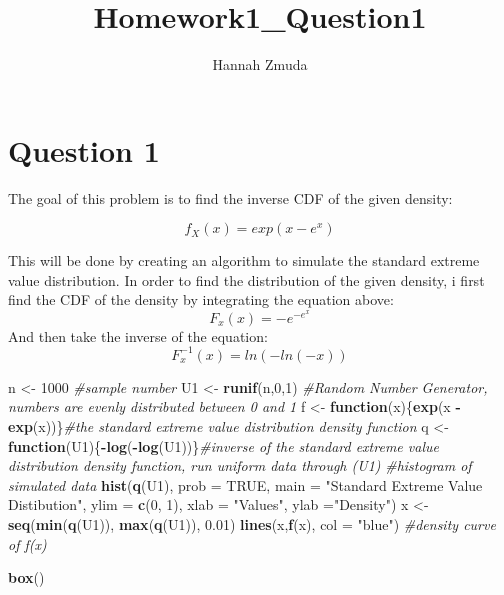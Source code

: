 \documentclass[
]{article}
\title{Homework1\_Question1}
\author{Hannah Zmuda}
\date{}
\newenvironment{Shaded}{\begin{snugshade}}{\end{snugshade}}
\newcommand{\CommentTok}[1]{\textcolor[rgb]{0.56,0.35,0.01}{\textit{#1}}}
\newcommand{\ControlFlowTok}[1]{\textcolor[rgb]{0.13,0.29,0.53}{\textbf{#1}}}
\newcommand{\DataTypeTok}[1]{\textcolor[rgb]{0.13,0.29,0.53}{#1}}
\newcommand{\DecValTok}[1]{\textcolor[rgb]{0.00,0.00,0.81}{#1}}
\newcommand{\FloatTok}[1]{\textcolor[rgb]{0.00,0.00,0.81}{#1}}
\newcommand{\KeywordTok}[1]{\textcolor[rgb]{0.13,0.29,0.53}{\textbf{#1}}}
\newcommand{\NormalTok}[1]{#1}
\newcommand{\OperatorTok}[1]{\textcolor[rgb]{0.81,0.36,0.00}{\textbf{#1}}}
\newcommand{\OtherTok}[1]{\textcolor[rgb]{0.56,0.35,0.01}{#1}}
\newcommand{\StringTok}[1]{\textcolor[rgb]{0.31,0.60,0.02}{#1}}
\begin{document}
\maketitle

\hypertarget{question-1}{%
\section{Question 1}\label{question-1}}

The goal of this problem is to find the inverse CDF of the given
density:

\[ f_X(x) = exp(x - e^x)\]

This will be done by creating an algorithm to simulate the standard
extreme value distribution. In order to find the distribution of the
given density, i first find the CDF of the density by integrating the
equation above: \[F_x(x) = -e^{-e^{x}}\] And then take the inverse of
the equation: \[F_x^{-1}(x) = ln(-ln(-x))\]

\begin{Shaded}
\begin{Highlighting}[]
\NormalTok{n <-}\StringTok{ }\DecValTok{1000} \CommentTok{#sample number}
\NormalTok{U1 <-}\StringTok{ }\KeywordTok{runif}\NormalTok{(n,}\DecValTok{0}\NormalTok{,}\DecValTok{1}\NormalTok{) }\CommentTok{#Random Number Generator, numbers are evenly distributed between 0 and 1}
\NormalTok{f <-}\StringTok{ }\ControlFlowTok{function}\NormalTok{(x)\{}\KeywordTok{exp}\NormalTok{(x }\OperatorTok{-}\StringTok{ }\KeywordTok{exp}\NormalTok{(x))\}}\CommentTok{#the standard extreme value distribution density function}
\NormalTok{q <-}\StringTok{ }\ControlFlowTok{function}\NormalTok{(U1)\{}\OperatorTok{-}\KeywordTok{log}\NormalTok{(}\OperatorTok{-}\KeywordTok{log}\NormalTok{(U1))\}}\CommentTok{#inverse of the standard extreme value distribution density function, run uniform data through (U1)}
\CommentTok{#histogram of simulated data}
\KeywordTok{hist}\NormalTok{(}\KeywordTok{q}\NormalTok{(U1), }\DataTypeTok{prob =} \OtherTok{TRUE}\NormalTok{, }\DataTypeTok{main =} \StringTok{"Standard Extreme Value Distibution"}\NormalTok{, }\DataTypeTok{ylim =} \KeywordTok{c}\NormalTok{(}\DecValTok{0}\NormalTok{, }\DecValTok{1}\NormalTok{), }\DataTypeTok{xlab =} \StringTok{"Values"}\NormalTok{, }\DataTypeTok{ylab =}\StringTok{"Density"}\NormalTok{)}
\NormalTok{x <-}\StringTok{ }\KeywordTok{seq}\NormalTok{(}\KeywordTok{min}\NormalTok{(}\KeywordTok{q}\NormalTok{(U1)), }\KeywordTok{max}\NormalTok{(}\KeywordTok{q}\NormalTok{(U1)), }\FloatTok{0.01}\NormalTok{)}
\KeywordTok{lines}\NormalTok{(x,}\KeywordTok{f}\NormalTok{(x), }\DataTypeTok{col =} \StringTok{"blue"}\NormalTok{) }\CommentTok{#density curve of f(x)}

\KeywordTok{box}\NormalTok{()}
\end{Highlighting}
\end{Shaded}
\end{document}
